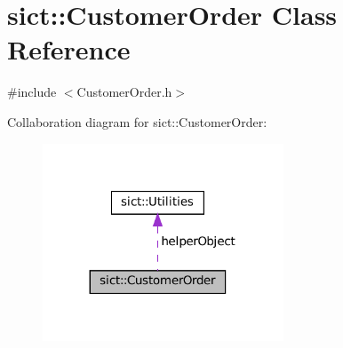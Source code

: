 \hypertarget{classsict_1_1CustomerOrder}{}\section{sict\+::Customer\+Order Class Reference}
\label{classsict_1_1CustomerOrder}


{\ttfamily \#include $<$Customer\+Order.\+h$>$}



Collaboration diagram for sict\+::Customer\+Order\+:
\nopagebreak
\begin{figure}[H]
\begin{center}
\leavevmode
\includegraphics[width=203pt]{classsict_1_1CustomerOrder__coll__graph}
\end{center}
\end{figure}
